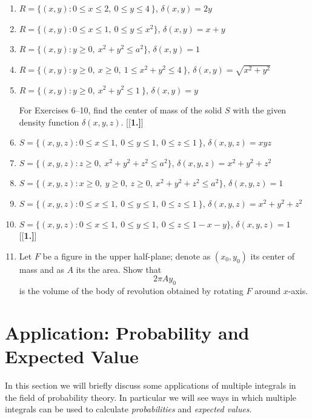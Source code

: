 \begin{enumerate}[\bfseries 1.]
 \item $R = \lbrace (x,y): 0 \le x \le 2,~ 0 \le y \le 4~ \rbrace$, $\delta(x,y) = 2y$
 \item $R = \lbrace (x,y): 0 \le x \le 1,~ 0 \le y \le x^2 \rbrace$, $\delta(x,y) = x+y$
 \item $R = \lbrace (x,y): y \ge 0, ~x^2 + y^2 \le a^2 \rbrace$, $\delta(x,y) = 1$
 \item $R = \lbrace (x,y): y \ge 0,~ x \ge 0, ~ 1 \le x^2 + y^2 \le 4~ \rbrace$, $\delta(x,y) = \sqrt{x^2 + y^2}$
 \item $R = \lbrace (x,y): y \ge 0, ~x^2 + y^2 \le 1~ \rbrace$, $\delta(x,y) = y$
\par\noindent For Exercises 6--10, find the center of mass of the solid $S$ with the given density function
$\delta(x,y,z)$.
[{[\bfseries 1.]}]
 \item $S = \lbrace (x,y,z): 0 \le x \le 1,~ 0 \le y \le 1,~ 0 \le z \le 1~ \rbrace$, $\delta(x,y,z) = xyz$
 \item $S = \lbrace (x,y,z): z \ge 0,~ x^2 + y^2 + z^2 \le a^2 \rbrace$, $\delta(x,y,z) = x^2 + y^2 + z^2$
 \item $S = \lbrace (x,y,z): x \ge 0,~ y \ge 0,~ z \ge 0, ~x^2 + y^2 + z^2 \le a^2 \rbrace$, $\delta(x,y,z) = 1$
 \item $S = \lbrace (x,y,z): 0 \le x \le 1,~ 0 \le y \le 1,~ 0 \le z \le 1~ \rbrace$, $\delta(x,y,z) = x^2 + y^2 + z^2$
 \item $S = \lbrace (x,y,z): 0 \le x \le 1,~ 0 \le y \le 1,~ 0 \le z \le 1 - x - y \rbrace$, $\delta(x,y,z) = 1$
[{[\bfseries 1.]}]
\item Let $F$ be a figure in the upper half-plane;
denote as $(x_0,y_0)$ its center of mass 
and as $A$ its the area.
Show that 
\[2\pi A y_0\]
is the volume of the body of revolution obtained by rotating $F$ around $x$-axis.
\end{enumerate}
\newpage
\section{Application: Probability and Expected Value}
In this section we will briefly discuss some applications of multiple integrals in the field of
probability theory. In particular we will see ways in which multiple integrals can be used to calculate
\emph{probabilities} and \emph{expected values}.\medskip

